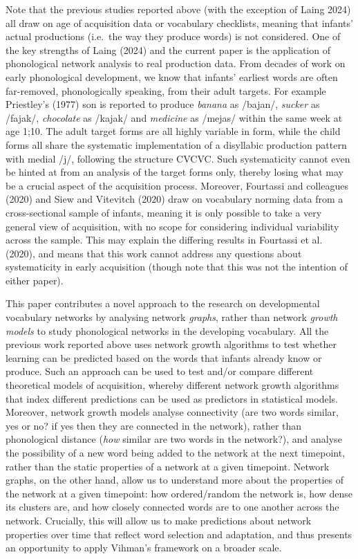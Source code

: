 \documentclass[
  man]{apa6}
\begin{document}
Note that the previous studies reported above (with the exception of Laing 2024) all draw on age of acquisition data or vocabulary checklists, meaning that infants' actual productions (i.e.~the way they produce words) is not considered. One of the key strengths of Laing (2024) and the current paper is the application of phonological network analysis to real production data. From decades of work on early phonological development, we know that infants' earliest words are often far-removed, phonologically speaking, from their adult targets. For example Priestley's (1977) son is reported to produce \emph{banana} as /bajan/, \emph{sucker} as /fajak/, \emph{chocolate} as /kajak/ and \emph{medicine} as /mejas/ within the same week at age 1;10. The adult target forms are all highly variable in form, while the child forms all share the systematic implementation of a disyllabic production pattern with medial /j/, following the structure CVCVC. Such systematicity cannot even be hinted at from an analysis of the target forms only, thereby losing what may be a crucial aspect of the acquisition process. Moreover, Fourtassi and colleagues (2020) and Siew and Vitevitch (2020) draw on vocabulary norming data from a cross-sectional sample of infants, meaning it is only possible to take a very general view of acquisition, with no scope for considering individual variability across the sample. This may explain the differing results in Fourtassi et al. (2020), and means that this work cannot address any questions about systematicity in early acquisition (though note that this was not the intention of either paper).

This paper contributes a novel approach to the research on developmental vocabulary networks by analysing network \emph{graphs}, rather than network \emph{growth models} to study phonological networks in the developing vocabulary. All the previous work reported above uses network growth algorithms to test whether learning can be predicted based on the words that infants already know or produce. Such an approach can be used to test and/or compare different theoretical models of acquisition, whereby different network growth algorithms that index different predictions can be used as predictors in statistical models. Moreover, network growth models analyse connectivity (are two words similar, yes or no? if yes then they are connected in the network), rather than phonological distance (\emph{how} similar are two words in the network?), and analyse the possibility of a new word being added to the network at the next timepoint, rather than the static properties of a network at a given timepoint. Network graphs, on the other hand, allow us to understand more about the properties of the network at a given timepoint: how ordered/random the network is, how dense its clusters are, and how closely connected words are to one another across the network. Crucially, this will allow us to make predictions about network properties over time that reflect word selection and adaptation, and thus presents an opportunity to apply Vihman's framework on a broader scale.
\end{document}
